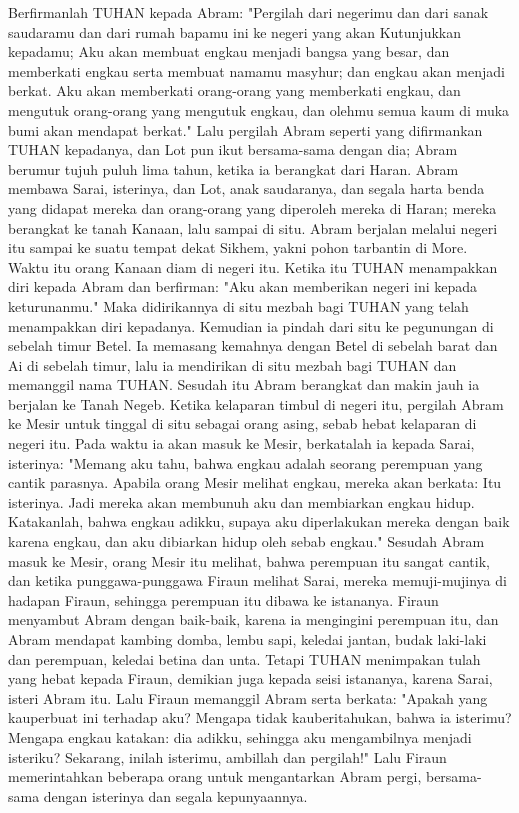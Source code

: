 \begin{biblechapter} %
 Berfirmanlah TUHAN kepada Abram: "Pergilah dari negerimu dan dari sanak saudaramu dan dari rumah bapamu ini ke negeri yang akan Kutunjukkan kepadamu;
\verse Aku akan membuat engkau menjadi bangsa yang besar, dan memberkati engkau serta membuat namamu masyhur; dan engkau akan menjadi berkat.
\verse Aku akan memberkati orang-orang yang memberkati engkau, dan mengutuk orang-orang yang mengutuk engkau, dan olehmu semua kaum di muka bumi akan mendapat berkat."
\verse Lalu pergilah Abram seperti yang difirmankan TUHAN kepadanya, dan Lot pun ikut bersama-sama dengan dia; Abram berumur tujuh puluh lima tahun, ketika ia berangkat dari Haran.
\verse Abram membawa Sarai, isterinya, dan Lot, anak saudaranya, dan segala harta benda yang didapat mereka dan orang-orang yang diperoleh mereka di Haran; mereka berangkat ke tanah Kanaan, lalu sampai di situ.
\verse Abram berjalan melalui negeri itu sampai ke suatu tempat dekat Sikhem, yakni pohon tarbantin di More. Waktu itu orang Kanaan diam di negeri itu.
\verse Ketika itu TUHAN menampakkan diri kepada Abram dan berfirman: "Aku akan memberikan negeri ini kepada keturunanmu." Maka didirikannya di situ mezbah bagi TUHAN yang telah menampakkan diri kepadanya.
\verse Kemudian ia pindah dari situ ke pegunungan di sebelah timur Betel. Ia memasang kemahnya dengan Betel di sebelah barat dan Ai di sebelah timur, lalu ia mendirikan di situ mezbah bagi TUHAN dan memanggil nama TUHAN.
\verse Sesudah itu Abram berangkat dan makin jauh ia berjalan ke Tanah Negeb.
 Ketika kelaparan timbul di negeri itu, pergilah Abram ke Mesir untuk tinggal di situ sebagai orang asing, sebab hebat kelaparan di negeri itu.
\verse Pada waktu ia akan masuk ke Mesir, berkatalah ia kepada Sarai, isterinya: "Memang aku tahu, bahwa engkau adalah seorang perempuan yang cantik parasnya.
\verse Apabila orang Mesir melihat engkau, mereka akan berkata: Itu isterinya. Jadi mereka akan membunuh aku dan membiarkan engkau hidup.
\verse Katakanlah, bahwa engkau adikku, supaya aku diperlakukan mereka dengan baik karena engkau, dan aku dibiarkan hidup oleh sebab engkau."
\verse Sesudah Abram masuk ke Mesir, orang Mesir itu melihat, bahwa perempuan itu sangat cantik,
\verse dan ketika punggawa-punggawa Firaun melihat Sarai, mereka memuji-mujinya di hadapan Firaun, sehingga perempuan itu dibawa ke istananya.
\verse Firaun menyambut Abram dengan baik-baik, karena ia mengingini perempuan itu, dan Abram mendapat kambing domba, lembu sapi, keledai jantan, budak laki-laki dan perempuan, keledai betina dan unta.
\verse Tetapi TUHAN menimpakan tulah yang hebat kepada Firaun, demikian juga kepada seisi istananya, karena Sarai, isteri Abram itu.
\verse Lalu Firaun memanggil Abram serta berkata: "Apakah yang kauperbuat ini terhadap aku? Mengapa tidak kauberitahukan, bahwa ia isterimu?
\verse Mengapa engkau katakan: dia adikku, sehingga aku mengambilnya menjadi isteriku? Sekarang, inilah isterimu, ambillah dan pergilah!"
\verse Lalu Firaun memerintahkan beberapa orang untuk mengantarkan Abram pergi, bersama-sama dengan isterinya dan segala kepunyaannya.
\end{biblechapter}

